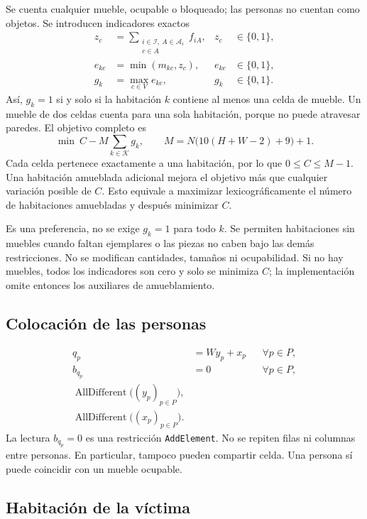 \documentclass[11pt,a4paper]{article}
\newcommand{\B}{\{0,1\}}
\begin{document}
Se cuenta cualquier mueble, ocupable o bloqueado; las personas no
cuentan como objetos. Se introducen indicadores exactos
\begin{align}
 z_c&=\sum_{\substack{i\in\mathcal I,\ A\in\mathcal A_i\\c\in A}}f_{iA},
       &z_c&\in\B,\\
 e_{kc}&=\min(m_{kc},z_c),
       &e_{kc}&\in\B,\\
 g_k&=\max_{c\in V}e_{kc},
       &g_k&\in\B.
\end{align}
As\'i, $g_k=1$ si y solo si la habitaci\'on $k$ contiene al menos
una celda de mueble. Un mueble de dos celdas cuenta para una sola
habitaci\'on, porque no puede atravesar paredes.
El objetivo completo es
\[
 \boxed{\min\ C-M\sum_{k\in\mathcal K}g_k,\qquad
 M=N\bigl(10(H+W-2)+9\bigr)+1.}
\]
Cada celda pertenece exactamente a una habitaci\'on, por lo que
$0\leq C\leq M-1$. Una habitaci\'on amueblada adicional mejora el
objetivo m\'as que cualquier variaci\'on posible de $C$.
Esto equivale a maximizar lexicogr\'aficamente el n\'umero de
habitaciones amuebladas y despu\'es minimizar $C$.

Es una preferencia, no se exige $g_k=1$ para todo $k$. Se permiten
habitaciones sin muebles cuando faltan ejemplares o las piezas no
caben bajo las dem\'as restricciones. No se modifican cantidades,
tama\~nos ni ocupabilidad. Si no hay muebles, todos los indicadores
son cero y solo se minimiza $C$; la implementaci\'on omite entonces
los auxiliares de amueblamiento.

\subsection{Colocaci\'on de las personas}

\begin{align}
 q_p&=Wy_p+x_p &&\forall p\in P,\\
 b_{q_p}&=0 &&\forall p\in P,\\
 \operatorname{AllDifferent}\bigl((y_p)_{p\in P}\bigr),&\\
 \operatorname{AllDifferent}\bigl((x_p)_{p\in P}\bigr).&
\end{align}
La lectura $b_{q_p}=0$ es una restricci\'on \texttt{AddElement}.
No se repiten filas ni columnas entre personas. En particular, tampoco
pueden compartir celda. Una persona s\'i puede coincidir con un mueble
ocupable.

\subsection{Habitaci\'on de la v\'ictima}
\end{document}
